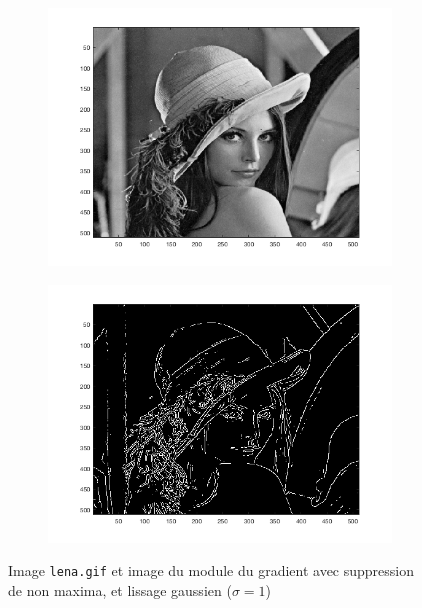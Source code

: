\documentclass[a4paper]{article}
\begin{document}
\begin{figure}[H]
    \centering
    \begin{subfigure}[c]{0.46\textwidth}
        \centering
        \includegraphics[width=\textwidth]{images/lena.png}
    \end{subfigure}
    \begin{subfigure}[c]{0.46\textwidth}
        \centering
        \includegraphics[width=\textwidth]{images/lena_nms_gauss1.png}
    \end{subfigure}
    \caption{Image \texttt{lena.gif} et image du module du gradient avec
    suppression de non maxima, et lissage gaussien ($\sigma = 1$)}
    \label{fig:lena-nms-gauss}
\end{figure}
\end{document}
